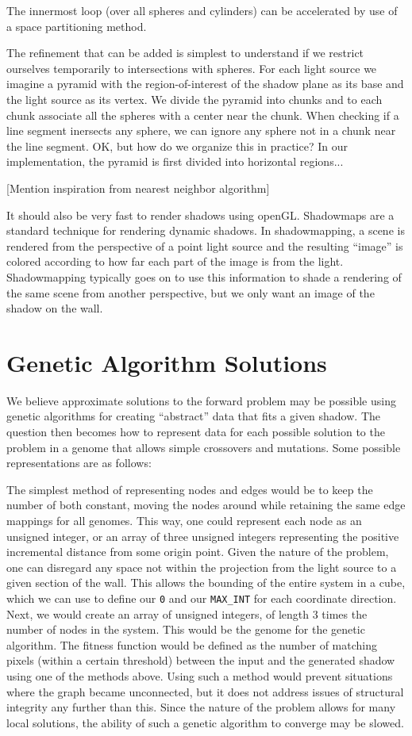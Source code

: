 \documentclass[10pt]{article}
\begin{document}
The innermost loop (over all spheres and cylinders) can be accelerated by use of a space partitioning method.

The refinement that can be added is simplest to understand if we restrict ourselves temporarily to intersections with spheres. For each light source we imagine a pyramid with the region-of-interest of the shadow plane as its base and the light source as its vertex. We divide the pyramid into chunks and to each chunk associate all the spheres with a center near the chunk. When checking if a line segment inersects any sphere, we can ignore any sphere not in a chunk near the line segment. OK, but how do we organize this in practice? In our implementation, the pyramid is first divided into horizontal regions...

[Mention inspiration from nearest neighbor algorithm]


It should also be very fast to render shadows using openGL. Shadowmaps are a standard technique for rendering dynamic shadows. In shadowmapping, a scene is rendered from the perspective of a point light source and the resulting ``image'' is colored according to how far each part of the image is from the light. Shadowmapping typically goes on to use this information to shade a rendering of the same scene from another perspective, but we only want an image of the shadow on the wall.

\section{Genetic Algorithm Solutions}
We believe approximate solutions to the forward problem may be possible using genetic algorithms for creating ``abstract'' data that fits a given shadow.  The question then becomes how to represent data for each possible solution to the problem in a genome that allows simple crossovers and mutations.  Some possible representations are as follows: 

The simplest method of representing nodes and edges would be to keep the number of both constant, moving the nodes around while retaining the same edge mappings for all genomes.  This way, one could represent each node as an unsigned integer, or an array of three unsigned integers representing the positive incremental distance from some origin point.  Given the nature of the problem, one can disregard any space not within the projection from the light source to a given section of the wall.  This allows the bounding of the entire system in a cube, which we can use to define our \texttt{0} and our \texttt{MAX\_INT} for each coordinate direction.  Next, we would create an array of unsigned integers, of length 3 times the number of nodes in the system.  This would be the genome for the genetic algorithm.  The fitness function would be defined as the number of matching pixels (within a certain threshold) between the input and the generated shadow using one of the methods above.  Using such a method would prevent situations where the graph became unconnected, but it does not address issues of structural integrity any further than this.  Since the nature of the problem allows for many local solutions, the ability of such a genetic algorithm to converge may be slowed.
\end{document}
